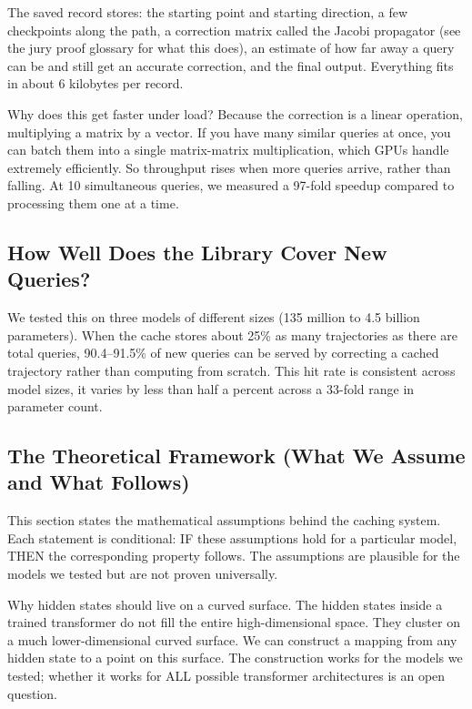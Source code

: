 \documentclass[11pt]{article}
\begin{document}
The saved record stores: the starting point and starting direction, a few
checkpoints along the path, a correction matrix called the Jacobi propagator
(see the jury proof glossary for what this does), an estimate of how far away
a query can be and still get an accurate correction, and the final output.
Everything fits in about 6 kilobytes per record.

Why does this get faster under load? Because the correction is a linear
operation, multiplying a matrix by a vector. If you have many similar queries
at once, you can batch them into a single matrix-matrix multiplication, which
GPUs handle extremely efficiently. So throughput rises when more
queries arrive, rather than falling. At 10 simultaneous queries, we measured
a 97-fold speedup compared to processing them one at a time.

\subsection{How Well Does the Library Cover New Queries?}

We tested this on three models of different sizes (135 million to 4.5 billion
parameters). When the cache stores about 25\% as many trajectories as there
are total queries, 90.4--91.5\% of new queries can be served by correcting a
cached trajectory rather than computing from scratch. This hit rate is
consistent across model sizes, it varies by less than half a
percent across a 33-fold range in parameter count.

\subsection{The Theoretical Framework (What We Assume and What Follows)}

This section states the mathematical assumptions behind the caching system.
Each statement is conditional: IF these assumptions hold for a particular
model, THEN the corresponding property follows. The assumptions are plausible
for the models we tested but are not proven universally.

Why hidden states should live on a curved surface. The hidden states
inside a trained transformer do not fill the entire high-dimensional space.
They cluster on a much lower-dimensional curved surface. We can construct a
mapping from any hidden state to a point on this surface. The construction
works for the models we tested; whether it works for ALL possible transformer
architectures is an open question.
\end{document}
